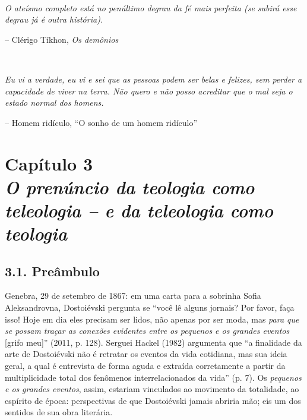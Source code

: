 \bigskip

\, \ 
\begin{minipage}{0.84\textwidth}
\scriptsize\emph{O ateísmo completo está no penúltimo degrau da fé mais perfeita (se
subirá esse degrau já é outra história).}

\smallskip
\hspace*{\fill}-- Clérigo Tíkhon, \emph{Os demônios}\footnotemark
\end{minipage}

\bigskip

\, \ 
\begin{minipage}{0.84\textwidth}
\scriptsize\emph{Eu vi a verdade, eu vi e sei que as pessoas podem ser belas e felizes,
sem perder a capacidade de viver na terra. Não quero e não posso
acreditar que o mal seja o estado normal dos homens.}

\smallskip
\hspace*{\fill}-- Homem ridículo, ``O sonho de um homem ridículo''\footnotemark
\end{minipage}

\thispagestyle{empty}

\chapter*{Capítulo 3\\
\bigskip
\emph{O prenúncio da teologia como teleologia -- e da teleologia como teologia}}


\section{3.1. Preâmbulo}

Genebra, 29 de setembro de 1867: em uma carta para a sobrinha Sofia
Aleksandrovna, Dostoiévski pergunta se ``você lê alguns jornais? Por
favor, faça isso! Hoje em dia eles precisam ser lidos, não apenas por
ser moda, mas \emph{para que se possam traçar as conexões evidentes
entre os pequenos e os grandes eventos} {[}grifo meu{]}'' (2011, p.
128). Serguei Hackel (1982) argumenta que ``a finalidade da arte de
Dostoiévski não é retratar os eventos da vida cotidiana, mas sua ideia
geral, a qual é entrevista de forma aguda e extraída corretamente a
partir da multiplicidade total dos fenômenos interrelacionados da vida''
(p. 7). Os \emph{pequenos e os} \emph{grandes eventos}, assim, estariam
vinculados ao movimento da totalidade, ao espírito de época:
perspectivas de que Dostoiévski jamais abriria mão; eis um dos sentidos
de sua obra literária.


